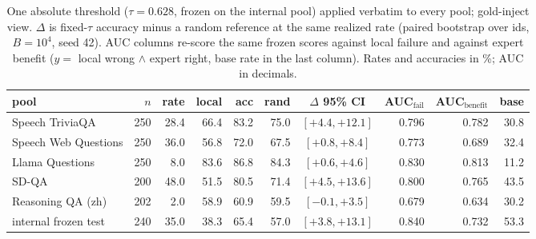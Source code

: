 \begin{table}[h]
\centering\footnotesize
\setlength{\tabcolsep}{4pt}
\caption{One absolute threshold ($\tau{=}0.628$, frozen on the internal
pool) applied verbatim to every pool; gold-inject view. $\Delta$ is
fixed-$\tau$ accuracy minus a random reference at the same
realized rate (paired bootstrap over ids, $B{=}10^4$, seed 42). AUC
columns re-score the same frozen scores against local failure and
against expert benefit ($y{=}$ local wrong $\wedge$ expert right, base
rate in the last column). Rates and accuracies in \%; AUC in
decimals.}
\label{tab:fixedthr}
\begin{tabular}{lrrrrrcrrr}
\toprule
pool & $n$ & rate & local & acc & rand & $\Delta$ 95\% CI & AUC$_{\text{fail}}$ & AUC$_{\text{benefit}}$ & base \\
\midrule
Speech TriviaQA & 250 & 28.4 & 66.4 & 83.2 & 75.0 & $[+4.4,+12.1]$ & 0.796 & 0.782 & 30.8 \\
Speech Web Questions & 250 & 36.0 & 56.8 & 72.0 & 67.5 & $[+0.8,+8.4]$ & 0.773 & 0.689 & 32.4 \\
Llama Questions & 250 & 8.0 & 83.6 & 86.8 & 84.3 & $[+0.6,+4.6]$ & 0.830 & 0.813 & 11.2 \\
SD-QA & 200 & 48.0 & 51.5 & 80.5 & 71.4 & $[+4.5,+13.6]$ & 0.800 & 0.765 & 43.5 \\
Reasoning QA (zh) & 202 & 2.0 & 58.9 & 60.9 & 59.5 & $[-0.1,+3.5]$ & 0.679 & 0.634 & 30.2 \\
\midrule
internal frozen test & 240 & 35.0 & 38.3 & 65.4 & 57.0 & $[+3.8,+13.1]$ & 0.840 & 0.732 & 53.3 \\
\bottomrule
\end{tabular}
\end{table}

